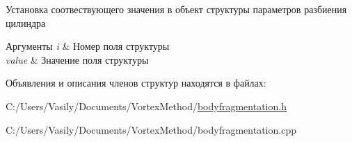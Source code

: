 Установка соотвествующего значения в объект структуры параметров разбиения цилиндра 
\begin{DoxyParams}{Аргументы}
{\em i} & Номер поля структуры \\
\hline
{\em value} & Значение поля структуры \\
\hline
\end{DoxyParams}


Объявления и описания членов структур находятся в файлах\+:\begin{DoxyCompactItemize}
\item 
C\+:/\+Users/\+Vasily/\+Documents/\+Vortex\+Method/\mbox{\hyperlink{bodyfragmentation_8h}{bodyfragmentation.\+h}}\item 
C\+:/\+Users/\+Vasily/\+Documents/\+Vortex\+Method/bodyfragmentation.\+cpp\end{DoxyCompactItemize}
